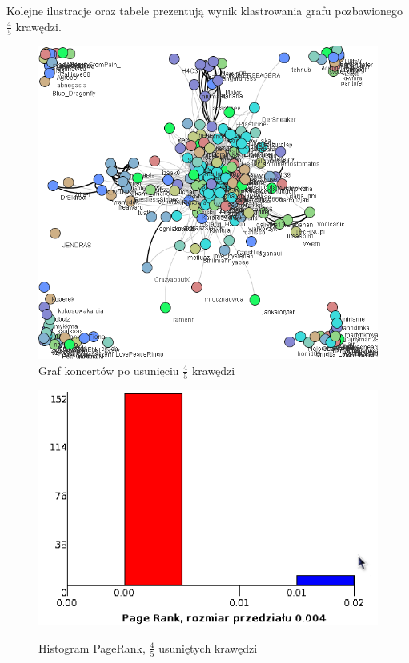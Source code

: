 \documentclass[10pt,a4paper]{article}
\begin{document}
  Kolejne ilustracje oraz tabele prezentują wynik klastrowania grafu pozbawionego  $\frac{4}{5}$  krawędzi.
\begin{figure}[H]
\centering
\caption{Graf koncertów po usunięciu $\frac{4}{5}$ krawędzi}
\includegraphics[scale=0.5]{wyniki/final200Events/4200events.png}
\end{figure}

\begin{figure}[H]
\centering
\caption{Histogram PageRank, $\frac{4}{5}$ usuniętych krawędzi}
\includegraphics[scale=0.6]{wyniki/final200Events/4200eventsPRHist.png}
\label{fig:1200lovedPRHist}
\end{figure}
\end{document}

